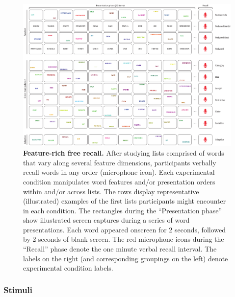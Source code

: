 \documentclass[11pt]{article}
\begin{document}
\begin{figure}[tp]
    \centering
        \includegraphics[width=\textwidth]{figures/FRFR}
        
\caption{\textbf{Feature-rich free recall.} After studying lists comprised of
words that vary along several feature dimensions, participants verbally recall
words in any order (microphone icon). Each experimental condition manipulates
word features and/or presentation orders within and/or across lists. The rows
display representative (illustrated) examples of the first lists participants
might encounter in each condition. The rectangles during the ``Presentation
phase'' show illustrated screen captures during a series of word presentations.
Each word appeared onscreen for 2 seconds, followed by 2 seconds of blank
screen. The red microphone icons during the ``Recall'' phase denote the one
minute verbal recall interval.  The labels on the right (and corresponding groupings on the left)
denote experimental condition labels.}

    \label{fig:exp}
\end{figure}



\subsubsection*{Stimuli}
\end{document}
